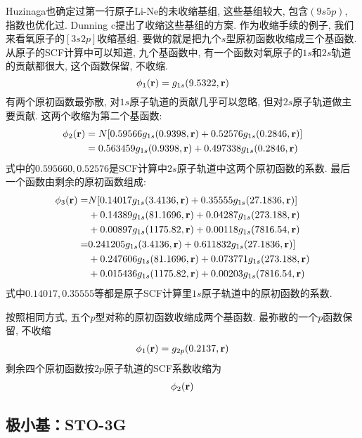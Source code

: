 Huzinaga也确定过第一行原子Li-Ne的未收缩基组, 这些基组较大, 包含$(9s5p)$, 指数也优化过. Dunning c提出了收缩这些基组的方案. 作为收缩手续的例子, 我们来看氧原子的$[3s2p]$收缩基组. 要做的就是把九个$s$型原初函数收缩成三个基函数. 从原子的SCF计算中可以知道, 九个基函数中, 有一个函数对氧原子的$1s$和$2s$轨道的贡献都很大, 这个函数保留, 不收缩.
\begin{equation}
\label{3.290}
\phi_1(\mathbf{r})=g_{1s}(9.5322,\mathbf{r})
\end{equation} 
有两个原初函数最弥散, 对$1s$原子轨道的贡献几乎可以忽略, 但对$2s$原子轨道做主要贡献. 这两个收缩为第二个基函数:
\begin{align}
\label{3.291}
\phi_2(\mathbf{r}) & = N[0.59566g_{1s}(0.9398,\mathbf{r}) + 0.52576 g_{1s}(0.2846,\mathbf{r})]\notag\\
			 & = 0.563459 g_{1s}(0.9398,\mathbf{r}) + 0.497338 g_{1s}(0.2846,\mathbf{r})
\end{align}
式中的$0.595660,0.52576$是SCF计算中$2s$原子轨道中这两个原初函数的系数. 最后一个函数由剩余的原初函数组成:
\begin{align}
\phi_3(\mathbf{r}) = &   N[0.14017g_{1s}(3.4136,\mathbf{r}) + 0.35555g_{1s}(27.1836,\mathbf{r})] \notag\\
               & + 0.14389g_{1s}(81.1696,\mathbf{r}) + 0.04287 g_{1s}(273.188,\mathbf{r}) \notag\\
               & + 0.00897g_{1s}(1175.82,\mathbf{r}) + 0.00118g_{1s}(7816.54,\mathbf{r}) \notag\\
             = & 0.241205g_{1s}(3.4136,\mathbf{r}) + 0.611832g_{1s}(27.1836,\mathbf{r})] \notag\\
             & + 0.247606g_{1s}(81.1696,\mathbf{r}) + 0.073771 g_{1s}(273.188,\mathbf{r}) \notag\\
             & + 0.015436g_{1s}(1175.82,\mathbf{r}) + 0.00203g_{1s}(7816.54,\mathbf{r})\\
\end{align}
式中$0.14017, 0.35555$等都是原子SCF计算里$1s$原子轨道中的原初函数的系数.

按照相同方式, 五个$p$型对称的原初函数收缩成两个基函数. 最弥散的一个$p$函数保留, 不收缩
\begin{align}
\phi_1(\mathbf{r}) = g_{2p}(0.2137,\mathbf{r})
\end{align}
剩余四个原初函数按$2p$原子轨道的SCF系数收缩为
\begin{align}
\phi_2(\mathbf{r}) 
\end{align}

\subsection{极小基：STO-3G}
